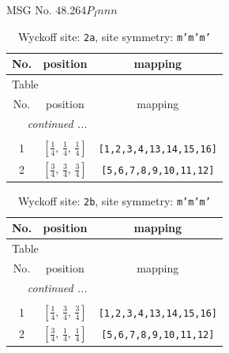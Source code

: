 \documentclass[fleqn,8pt]{jsarticle}
\begin{document}
\setcounter{MaxMatrixCols}{32}

\renewcommand{\tablename}{Table~}
\renewcommand{\figurename}{Figure~}
\begin{center}
\LARGE
MSG No. 48.264\quad$P_{I}nnn$
\end{center}
\renewcommand{\arraystretch}{1.2}
\begin{longtable}{ccc}
\caption{Wyckoff site: {\tt 2a}, site symmetry: {\tt m'm'm'}}
 \\
 \hline \hline
No. & position & mapping \\ \hline \endfirsthead

\multicolumn{2}{l}{\tablename\ \thetable{}} \\
 \hline \hline
No. & position & mapping \\ \hline \endhead

 \hline \hline
\multicolumn{2}{r}{\footnotesize\it continued ...} \\ \endfoot

 \hline \hline
\multicolumn{2}{r}{} \\ \endlastfoot

1 & $\left[ \frac{1}{4},\, \frac{1}{4},\, \frac{1}{4} \right]$ & {\tt [1,2,3,4,13,14,15,16]} \\ \hline
2 & $\left[ \frac{3}{4},\, \frac{3}{4},\, \frac{3}{4} \right]$ & {\tt [5,6,7,8,9,10,11,12]} \\
\end{longtable}
\renewcommand{\arraystretch}{1.2}
\begin{longtable}{ccc}
\caption{Wyckoff site: {\tt 2b}, site symmetry: {\tt m'm'm'}}
 \\
 \hline \hline
No. & position & mapping \\ \hline \endfirsthead

\multicolumn{2}{l}{\tablename\ \thetable{}} \\
 \hline \hline
No. & position & mapping \\ \hline \endhead

 \hline \hline
\multicolumn{2}{r}{\footnotesize\it continued ...} \\ \endfoot

 \hline \hline
\multicolumn{2}{r}{} \\ \endlastfoot

1 & $\left[ \frac{1}{4},\, \frac{3}{4},\, \frac{3}{4} \right]$ & {\tt [1,2,3,4,13,14,15,16]} \\ \hline
2 & $\left[ \frac{3}{4},\, \frac{1}{4},\, \frac{1}{4} \right]$ & {\tt [5,6,7,8,9,10,11,12]} \\
\end{longtable}
\end{document}
